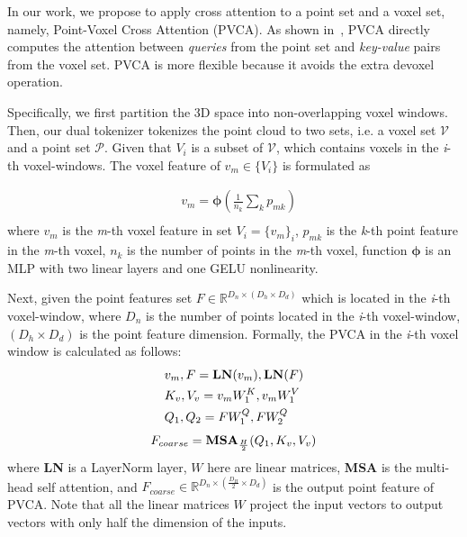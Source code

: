 \documentclass[10pt,twocolumn,letterpaper]{article}
\begin{document}
In our work, we propose to apply cross attention to a point set and a voxel set, namely, Point-Voxel Cross Attention (PVCA). As shown in~, PVCA directly computes the attention between \textit{queries} from the point set and \textit{key-value} pairs from the voxel set. PVCA is more flexible because it avoids the extra devoxel operation.



Specifically, we first partition the 3D space into non-overlapping voxel windows. Then, our dual tokenizer tokenizes the point cloud to two sets, i.e. a voxel set $\mathcal{V}$ and a point set $\mathcal{P}$. Given that $V_i$ is a subset of $\mathcal{V}$, which contains voxels in the \textit{i}-th voxel-windows. The voxel feature of $v_m\in\{V_i\}$ is formulated as



\begin{equation}
\begin{split}
& v_m = \boldsymbol{\phi}(\frac{1}{n_k} \sum_{k}p_{mk})\\
\end{split}
\end{equation}
where $v_m$ is the \textit{m}-th voxel feature in set $V_i=\{v_m\}_i$, $p_{mk}$ is the \textit{k}-th point feature in the \textit{m}-th voxel, $n_k$ is the number of points in the \textit{m}-th voxel, function $\boldsymbol{\phi}$ is an MLP with two linear layers and one GELU nonlinearity.

Next, given the point features set $F \in \mathbb{R}^{D_n\times(D_h \times D_d)}$ which is located in the \textit{i}-th voxel-window, where $D_n$ is the number of points located in the \textit{i}-th voxel-window, $(D_h \times D_d)$ is the point feature dimension. Formally, the PVCA in the \textit{i}-th voxel window is calculated as follows:
\begin{equation}
\begin{split}
& v_m, F = {\rm \textbf{LN}}(v_m), {\rm \textbf{LN}}(F)\\
& K_v, V_v = v_m {W}_1^K, v_m {W}_1^V\\
& Q_1, Q_2 = F{W}_1^Q, F{W}_2^Q\\
\end{split}
\end{equation}
\begin{equation}
\begin{split}
& F_{coarse} = {\rm \textbf{MSA}}_{\frac{H}{2}}(Q_1, K_v, V_v)\\
\end{split}    
\end{equation}
where \textbf{LN} is a LayerNorm layer, $W$ here are linear matrices, \textbf{MSA} is the multi-head self attention, and $F_{coarse}\in\mathbb{R}^{D_n\times(\frac{D_H}{2}\times D_d)}$ is the output point feature of PVCA. Note that all the linear matrices $W$ project the input vectors to output vectors with only half the dimension of the inputs.
\end{document}
